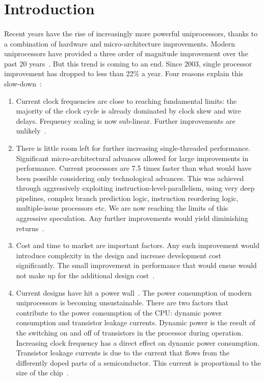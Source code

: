 \section{Introduction} 

\paragraph{} Recent years have the rise of increasingly 
more powerful uniprocessors, thanks to a combination
of hardware and micro-architecture improvements. Modern
uniprocessors have provided a three order of magnitude 
improvement over the past 20 years~\cite{borkar2011future}. 
But this trend is coming to an end. Since 2003, single
processor improvement has dropped to less than 22\% a year.
Four reasons explain this slow-down~\cite{hennessy2006comparchquantitative}: 
\begin{enumerate}
\item Current clock frequencies are close
to reaching fundamental limits: the majority of the clock cycle is 
already dominated by clock skew and wire delays. Frequency scaling
is now sub-linear. Further improvements
are unlikely~\cite{borkar2011future}.
\item There is little room left for further
increasing single-threaded performance. Significant micro-architectural advances
 allowed for large improvements in performance. Current processors
are 7.5 times faster than what would have been possible considering
only technological advances. This was achieved through aggressively
exploiting instruction-level-parallelism, using very deep pipelines,
complex branch prediction logic, instruction reordering logic, multiple-issue
processors etc. 
We are now reaching the limits of this aggressive speculation. Any 
further improvements would yield diminishing returns~\cite{Borkar:2007:TCC:1278480.1278667}.
\item Cost and
time to market are important factors. Any such improvement would 
introduce complexity in the design and increase development
cost significantly. The small improvement in performance that would
ensue would not make up for the additional design cost~\cite{hennessy2006comparchquantitative}. 
\item  Current designs have hit a power wall~\cite{FSSP:09}. The power consumption of modern
uniprocessors is becoming unsustainable. There are two factors that contribute 
to the power consumption of the CPU: dynamic power consumption
and transistor leakage currents. Dynamic power is the result
of the switching on and off of transistors in the processor
during operation. Increasing clock frequency has a direct
effect on dynamic power consumption.  Transistor leakage
currents is due to the current that flows from the differently
doped parts of a semiconductor. This current is proportional
to the size of the chip~\cite{Borkar:2007:TCC:1278480.1278667}. 
\end{enumerate}

